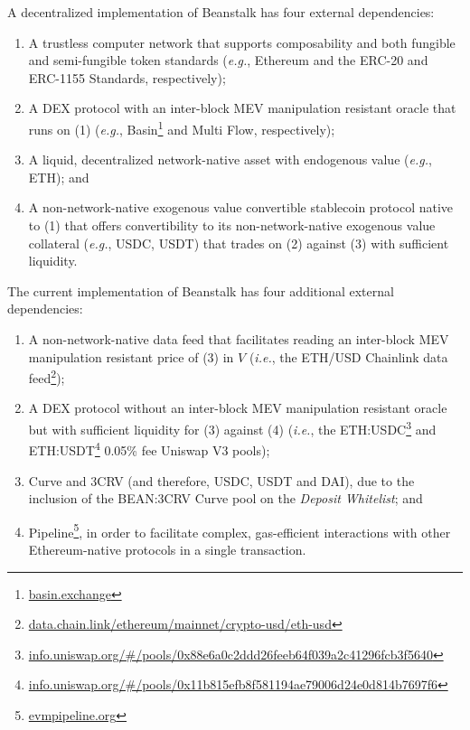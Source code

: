 \documentclass[tikz]{article}
\newcommand{\term}[1]{\textsl{#1}}
\newcommand{\fref}[1]{\footnote{\href{http://#1}{#1}}}
\begin{document}
A decentralized implementation of Beanstalk has four external dependencies:

\begin{enumerate}[label=(\arabic*)]
  \item A trustless computer network that supports composability and both fungible and semi-fungible token standards (\term{e.g.}, Ethereum and the ERC-20 and ERC-1155 Standards, respectively);
  \item A DEX protocol with an inter-block MEV manipulation resistant oracle that runs on (1) (\term{e.g.}, Basin\fref{basin.exchange} and Multi Flow, respectively); 
  \item A liquid, decentralized network-native asset with endogenous value (\term{e.g.}, ETH); and
  \item A non-network-native exogenous value convertible stablecoin protocol native to (1) that offers convertibility to its non-network-native exogenous value collateral (\term{e.g.}, USDC, USDT) that trades on (2) against (3) with sufficient liquidity.
\end{enumerate}

The current implementation of Beanstalk has four additional external dependencies: 

\begin{enumerate}[label=(\arabic*), start=5]
  \item A non-network-native data feed that facilitates reading an inter-block MEV manipulation resistant price of (3) in $V$ (\term{i.e.}, the ETH/USD Chainlink data feed\fref{data.chain.link/ethereum/mainnet/crypto-usd/eth-usd});
  \item A DEX protocol without an inter-block MEV manipulation resistant oracle but with sufficient liquidity for (3) against (4) (\term{i.e.}, the ETH:USDC\fref{info.uniswap.org/\#/pools/0x88e6a0c2ddd26feeb64f039a2c41296fcb3f5640} and ETH:USDT\fref{info.uniswap.org/\#/pools/0x11b815efb8f581194ae79006d24e0d814b7697f6} 0.05\% fee Uniswap V3 pools);
  \item Curve and 3CRV (and therefore, USDC, USDT and DAI), due to the inclusion of the BEAN:3CRV Curve pool on the \term{Deposit Whitelist}; and
  \item Pipeline\fref{evmpipeline.org}, in order to facilitate complex, gas-efficient interactions with other Ethereum-native protocols in a single transaction.
\end{enumerate}
\end{document}
